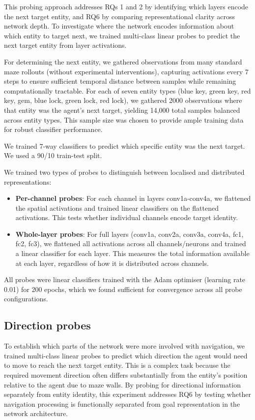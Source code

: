 This probing approach addresses RQs 1 and 2 by identifying which layers encode the next target entity, and RQ6 by comparing representational clarity across network depth. To investigate where the network encodes information about which entity to target next, we trained multi-class linear probes to predict the next target entity from layer activations.

For determining the next entity, we gathered observations from many standard maze rollouts (without experimental interventions), capturing activations every 7 steps to ensure sufficient temporal distance between samples while remaining computationally tractable. For each of seven entity types (blue key, green key, red key, gem, blue lock, green lock, red lock), we gathered 2000 observations where that entity was the agent's next target, yielding 14,000 total samples balanced across entity types. This sample size was chosen to provide ample training data for robust classifier performance.

We trained 7-way classifiers to predict which specific entity was the next target. We used a 90/10 train-test split.

We trained two types of probes to distinguish between localised and distributed representations:
\begin{itemize}
    \item \textbf{Per-channel probes}: For each channel in layers conv1a-conv4a, we flattened the spatial activations and trained linear classifiers on the flattened activations. This tests whether individual channels encode target identity.
    \item \textbf{Whole-layer probes}: For full layers (conv1a, conv2a, conv3a, conv4a, fc1, fc2, fc3), we flattened all activations across all channels/neurons and trained a linear classifier for each layer. This measures the total information available at each layer, regardless of how it is distributed across channels.
\end{itemize}

All probes were linear classifiers trained with the Adam optimiser (learning rate 0.01) for 200 epochs, which we found sufficient for convergence across all probe configurations.

\subsection{Direction probes}\label{subsec:directional_probes}
To establish which parts of the network were more involved with navigation, we trained multi-class linear probes to predict which direction the agent would need to move to reach the next target entity. This is a complex task because the required movement direction often differs substantially from the entity's position relative to the agent due to maze walls. By probing for directional information separately from entity identity, this experiment addresses RQ6 by testing whether navigation processing is functionally separated from goal representation in the network architecture.

